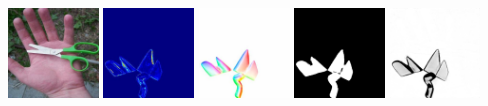     \\
    \includegraphics[width=0.18\textwidth]{ch-tomnet/images/Synth/synthetic_15_shape0000_COCO_val2014_000000311180_ref.jpg}
    \includegraphics[width=0.18\textwidth]{ch-tomnet/images/Synth/synthetic_15_shape0000_COCO_val2014_000000311180_diff.jpg}
    \includegraphics[width=0.18\textwidth]{ch-tomnet/images/Synth/synthetic_15_shape0000_COCO_val2014_000000311180_fcolor.jpg}
    \includegraphics[width=0.18\textwidth]{ch-tomnet/images/Synth/synthetic_15_shape0000_COCO_val2014_000000311180_mask.png}
    \includegraphics[width=0.18\textwidth]{ch-tomnet/images/Synth/synthetic_15_shape0000_COCO_val2014_000000311180_rho.png}
    \\ 

